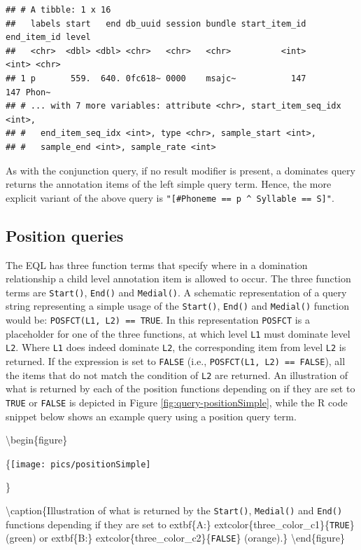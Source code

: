 \documentclass[]{book}
\begin{document}
\begin{verbatim}
## # A tibble: 1 x 16
##   labels start   end db_uuid session bundle start_item_id end_item_id level
##   <chr>  <dbl> <dbl> <chr>   <chr>   <chr>          <int>       <int> <chr>
## 1 p       559.  640. 0fc618~ 0000    msajc~           147         147 Phon~
## # ... with 7 more variables: attribute <chr>, start_item_seq_idx <int>,
## #   end_item_seq_idx <int>, type <chr>, sample_start <int>,
## #   sample_end <int>, sample_rate <int>
\end{verbatim}

As with the conjunction query, if no result modifier is present, a dominates query returns the annotation items of the left simple query term. Hence, the more explicit variant of the above query is \texttt{"{[}\#Phoneme\ ==\ p\ \^{}\ Syllable\ ==\ S{]}"}.

\hypertarget{subsec:query_positionQueries}{%
\subsection{Position queries}\label{subsec:query_positionQueries}}

The EQL has three function terms that specify where in a domination relationship a child level annotation item is allowed to occur. The three function terms are \texttt{Start()}, \texttt{End()} and \texttt{Medial()}. A schematic representation of a query string representing a simple usage of the \texttt{Start()}, \texttt{End()} and \texttt{Medial()} function would be: \texttt{POSFCT(L1,\ L2)\ ==\ TRUE}. In this representation \texttt{POSFCT} is a placeholder for one of the three functions, at which level \texttt{L1} must dominate level \texttt{L2}. Where \texttt{L1} does indeed dominate \texttt{L2}, the corresponding item from level \texttt{L2} is returned. If the expression is set to \texttt{FALSE} (i.e., \texttt{POSFCT(L1,\ L2)\ ==\ FALSE}), all the items that do not match the condition of \texttt{L2} are returned. An illustration of what is returned by each of the position functions depending on if they are set to \texttt{TRUE} or \texttt{FALSE} is depicted in Figure \ref{fig:query-positionSimple}, while the R code snippet below shows an example query using a position query term.

\textbackslash{}begin\{figure\}

\{\centering \texttt{[image: pics/positionSimple]}

\}

\textbackslash{}caption\{Illustration of what is returned by the \texttt{Start()}, \texttt{Medial()} and \texttt{End()} functions depending if they are set to extbf\{A:\} extcolor\{three\_color\_c1\}\{\texttt{TRUE}\} (green) or extbf\{B:\} extcolor\{three\_color\_c2\}\{\texttt{FALSE}\} (orange).\}\label{fig:query-positionSimple}
\textbackslash{}end\{figure\}
\end{document}
